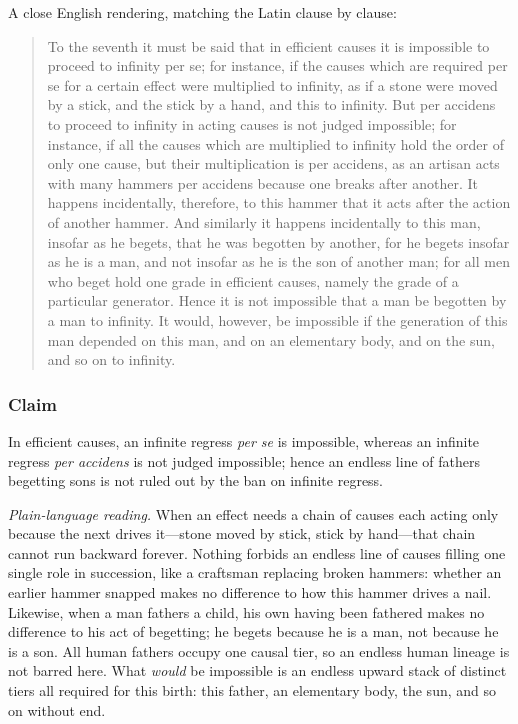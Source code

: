 A close English rendering, matching the Latin clause by clause:

\begin{quote}
To the seventh it must be said that in efficient causes it is impossible to proceed to infinity per se; for instance, if the causes which are required per se for a certain effect were multiplied to infinity, as if a stone were moved by a stick, and the stick by a hand, and this to infinity. But per accidens to proceed to infinity in acting causes is not judged impossible; for instance, if all the causes which are multiplied to infinity hold the order of only one cause, but their multiplication is per accidens, as an artisan acts with many hammers per accidens because one breaks after another. It happens incidentally, therefore, to this hammer that it acts after the action of another hammer. And similarly it happens incidentally to this man, insofar as he begets, that he was begotten by another, for he begets insofar as he is a man, and not insofar as he is the son of another man; for all men who beget hold one grade in efficient causes, namely the grade of a particular generator. Hence it is not impossible that a man be begotten by a man to infinity. It would, however, be impossible if the generation of this man depended on this man, and on an elementary body, and on the sun, and so on to infinity.
\end{quote}

\subsubsection*{Claim}

In efficient causes, an infinite regress \emph{per se} is impossible, whereas an infinite regress \emph{per accidens} is not judged impossible; hence an endless line of fathers begetting sons is not ruled out by the ban on infinite regress.

\emph{Plain-language reading.} When an effect needs a chain of causes each acting only because the next drives it---stone moved by stick, stick by hand---that chain cannot run backward forever. Nothing forbids an endless line of causes filling one single role in succession, like a craftsman replacing broken hammers: whether an earlier hammer snapped makes no difference to how this hammer drives a nail. Likewise, when a man fathers a child, his own having been fathered makes no difference to his act of begetting; he begets because he is a man, not because he is a son. All human fathers occupy one causal tier, so an endless human lineage is not barred here. What \emph{would} be impossible is an endless upward stack of distinct tiers all required for this birth: this father, an elementary body, the sun, and so on without end.

